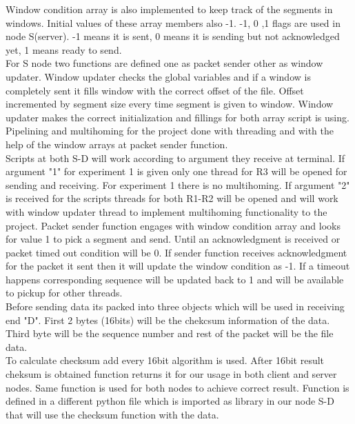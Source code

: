\documentclass[conference]{IEEEtran}
\begin{document}
Window condition array is also implemented to keep track of the segments in windows. Initial values of these array members also -1. -1, 0 ,1 flags are used in node S(server). 
 -1 means it is sent,
 0 means it is sending but not acknowledged yet,
 1 means ready to send.\\
 
 For S node two functions are defined one as packet sender other as window updater. Window updater checks the global variables and if a window is completely sent it fills window with the correct offset of the file. Offset incremented by segment size every time segment is given to window. Window updater makes the correct initialization and fillings for both array script is using.\\
 
Pipelining and multihoming for the project done with threading and with the help of the window arrays at packet sender function. \\

Scripts at both S-D will work according to argument they receive at terminal. If argument "1" for experiment 1 is given only one thread for R3 will be opened for sending and receiving. For  experiment 1 there is no multihoming. If argument "2" is received for the scripts threads for both R1-R2 will be opened and will work with window updater thread to implement multihoming functionality to the project. Packet sender function engages with window condition array and looks for value 1 to pick a segment and send. Until an acknowledgment is received or packet timed out condition will be 0. If sender function receives acknowledgment for the packet it sent then it will update the window condition as -1. If a timeout happens corresponding sequence will be updated back to 1 and will be available to pickup for other threads. \\

Before sending data its packed into three objects which will be used in receiving end "D". First 2 bytes (16bits) will be the chekcsum information of the data. Third byte will be the sequence number and rest of the packet will be the file data. \\

To calculate checksum add every 16bit algorithm is used. After 16bit result cheksum is obtained function returns it for our usage in both client and server nodes. Same function is used for both nodes to achieve correct result. Function is defined in a different python file which is imported as library in our node S-D that will use the checksum function with the data.\\
\end{document}
